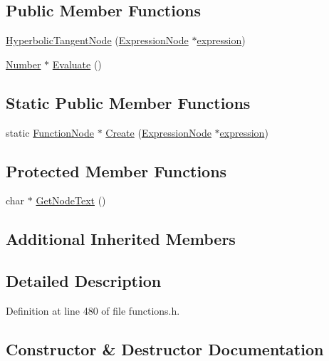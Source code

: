 \subsection*{Public Member Functions}
\begin{DoxyCompactItemize}
\item 
\hyperlink{classHyperbolicTangentNode_a18d198b26efeb8d15efae4fda943212b}{Hyperbolic\+Tangent\+Node} (\hyperlink{classExpressionNode}{Expression\+Node} $\ast$\hyperlink{classFunctionNode_ad7577b179a1937aaf8a0058bb5b546dc}{expression})
\item 
\hyperlink{structNumber}{Number} $\ast$ \hyperlink{classHyperbolicTangentNode_a7ea56cdbc709f28de4ff10486a79c2b5}{Evaluate} ()
\end{DoxyCompactItemize}
\subsection*{Static Public Member Functions}
\begin{DoxyCompactItemize}
\item 
static \hyperlink{classFunctionNode}{Function\+Node} $\ast$ \hyperlink{classHyperbolicTangentNode_a8e207d88423bd62a7a865c1a7b01c870}{Create} (\hyperlink{classExpressionNode}{Expression\+Node} $\ast$\hyperlink{classFunctionNode_ad7577b179a1937aaf8a0058bb5b546dc}{expression})
\end{DoxyCompactItemize}
\subsection*{Protected Member Functions}
\begin{DoxyCompactItemize}
\item 
char $\ast$ \hyperlink{classHyperbolicTangentNode_a7013c62abbe2d3248411624bcd32673f}{Get\+Node\+Text} ()
\end{DoxyCompactItemize}
\subsection*{Additional Inherited Members}


\subsection{Detailed Description}


Definition at line 480 of file functions.\+h.



\subsection{Constructor \& Destructor Documentation}
